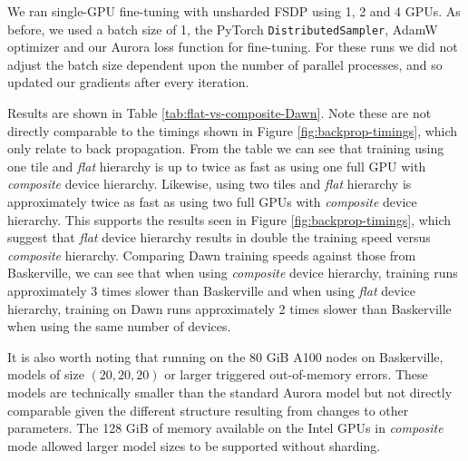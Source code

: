 We ran single-GPU fine-tuning with unsharded FSDP using 1, 2 and 4 GPUs. As before, we used a batch size of 1, the PyTorch {\tt DistributedSampler}, AdamW optimizer and our Aurora loss function for fine-tuning. For these runs we did not adjust the batch size dependent upon the number of parallel processes, and so updated our gradients after every iteration.

Results are shown in Table \ref{tab:flat-vs-composite-Dawn}. Note these are not directly comparable to the timings shown in Figure \ref{fig:backprop-timings}, which only relate to back propagation. From the table we can see that training using one tile and \textit{flat} hierarchy is up to twice as fast as using one full GPU with \textit{composite} device hierarchy. Likewise, using two tiles and \textit{flat} hierarchy is approximately twice as fast as using two full GPUs with \textit{composite} device hierarchy. This supports the results seen in Figure \ref{fig:backprop-timings}, which suggest that \textit{flat} device hierarchy results in double the training speed versus \textit{composite} hierarchy. Comparing Dawn training speeds against those from Baskerville, we can see that when using \textit{composite} device hierarchy, training runs approximately 3 times slower than Baskerville and when using \textit{flat} device hierarchy, training on Dawn runs approximately 2 times slower than Baskerville when using the same number of devices.

It is also worth noting that running on the 80 GiB A100 nodes on Baskerville, models of size $(20, 20, 20)$ or larger triggered out-of-memory errors. These models are technically smaller than the standard Aurora model but not directly comparable given the different structure resulting from changes to other parameters. The 128 GiB of memory available on the Intel GPUs in \textit{composite} mode allowed larger model sizes to be supported without sharding.


